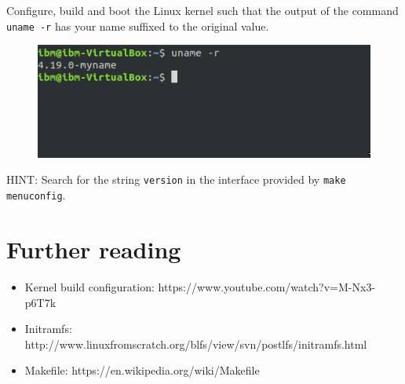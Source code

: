 \documentclass{beamer}
\begin{document}
\begin{frame}
  Configure, build and boot the Linux kernel such that the output of the
  command \texttt{uname -r} has your name suffixed to the original value. 
    \begin{figure}[h!]
      \centering
      \includegraphics[scale=0.5]{images/assignment.png}
    \end{figure}
    HINT: Search for the string \texttt{version} in the interface provided by
    \texttt{make menuconfig}.
\end{frame}

\section{Further reading}
\begin{frame}
  \begin{itemize}
  \item Kernel build configuration:
    { \tiny https://www.youtube.com/watch?v=M-Nx3-p6T7k }
  \item Initramfs: {\tiny  http://www.linuxfromscratch.org/blfs/view/svn/postlfs/initramfs.html}
  \item Makefile: { \tiny https://en.wikipedia.org/wiki/Makefile }
  \end{itemize}
\end{frame}
\end{document}
